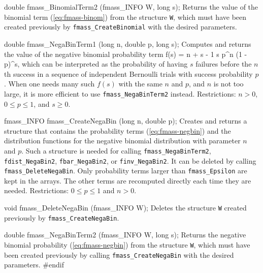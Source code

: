 double fmass_BinomialTerm2 (fmass_INFO W, long s);
\endcode
 \tab Returns the value of the binomial term  (\ref{eq:fmass-binom}) 
  from the structure {\tt W}, which must have been created previously
  by {\tt fmass\_CreateBinomial} with the desired parameters.
 \endtab


\code

double fmass_NegaBinTerm1 (long n, double p, long s);
\endcode
  \tab
   Computes and returns the value of the negative binomial 
   probability term 
   \eq
    f(s) = {n + s - 1 \choose s} p^n (1 - p)^{s}, 
   \endeq
   which can be interpreted as the probability of having $s$ failures 
   before the $n$th success in a sequence of independent Bernoulli trials 
   with success probability $p$.
   \ifdetailed %
   When one needs many such $f(s)$ with the same $n$ and $p$, and $n$ is
   not too large, it is more efficient to use 
   {\tt fmass\_NegaBinTerm2} instead.
   \fi %
   Restrictions: $n > 0$, $0\le p\le 1$, and $s\ge 0$.
  \endtab
\code


fmass_INFO fmass_CreateNegaBin (long n, double p);
\endcode
  \tab Creates and returns a structure that contains the probability
   terms (\ref{eq:fmass-negbin}) and the distribution functions for 
   the negative binomial distribution with parameter $n$ and $p$.
   Such a structure is needed for calling {\tt fmass\_NegaBinTerm2},
   {\tt fdist\_NegaBin2}, {\tt fbar\_NegaBin2}, or {\tt finv\_NegaBin2}.
   It can be deleted by calling {\tt fmass\_DeleteNegaBin}.
 \ifdetailed %
   Only probability terms larger than {\tt fmass\_Epsilon} 
   are kept in the arrays. The other terms are recomputed directly each time
   they are needed. 
 \fi %
   Restrictions: $0\le p\le 1$ and $n > 0$.
 \endtab
\code


void fmass_DeleteNegaBin (fmass_INFO W);
\endcode
 \tab Deletes the structure {\tt W} created previously 
   by {\tt fmass\_CreateNegaBin}.
 \endtab
\code

  
double fmass_NegaBinTerm2 (fmass_INFO W, long s);
\endcode
 \tab  Returns the negative binomial probability (\ref{eq:fmass-negbin})
  from the structure {\tt W}, which must have been created previously
  by calling {\tt fmass\_CreateNegaBin} with the desired parameters.
 \endtab
\code
\hide
#endif
\endhide
\endcode
